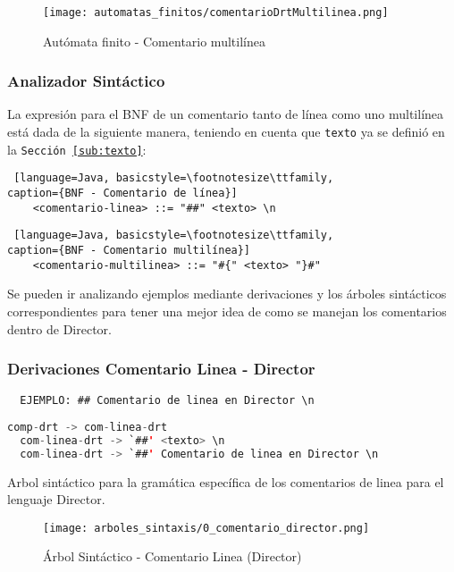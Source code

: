 \begin{figure}[H]
	\centering
	\texttt{[image: automatas\_finitos/comentarioDrtMultilinea.png]}
	\caption{Autómata finito - Comentario multilínea}
	\label{fig:af_com_multi}
\end{figure}

\subsubsection{Analizador Sintáctico}

La expresión para el BNF de un comentario tanto de línea como uno multilínea
está dada de la siguiente manera, teniendo en cuenta que \texttt{texto} ya se
definió en la \texttt{Sección \ref{sub:texto}}:

\begin{lstlisting} [language=Java, basicstyle=\footnotesize\ttfamily,
caption={BNF - Comentario de línea}]
	<comentario-linea> ::= "##" <texto> \n
\end{lstlisting}

\begin{lstlisting} [language=Java, basicstyle=\footnotesize\ttfamily,
caption={BNF - Comentario multilínea}]
	<comentario-multilinea> ::= "#{" <texto> "}#"
\end{lstlisting}

Se pueden ir analizando ejemplos mediante derivaciones y los árboles
sintácticos correspondientes para tener una mejor idea de como se manejan
los comentarios dentro de Director.

\subsubsection{Derivaciones Comentario Linea - Director}

\begin{lstlisting}
  EJEMPLO: ## Comentario de linea en Director \n
\end{lstlisting}

\begin{lstlisting}[basicstyle=\footnotesize\ttfamily, language=Java,
caption={Derivaciones - Comentario Linea (Director)}]
  comp-drt -> com-linea-drt
  com-linea-drt -> `##' <texto> \n
  com-linea-drt -> `##' Comentario de linea en Director \n
\end{lstlisting}

Arbol sintáctico para la gramática específica de los comentarios de linea para
el lenguaje Director.

\begin{figure}[H]
  \centering
  \texttt{[image: arboles\_sintaxis/0\_comentario\_director.png]}
  \caption{Árbol Sintáctico - Comentario Linea (Director)}
  \label{as:comlineadrt}
\end{figure}

